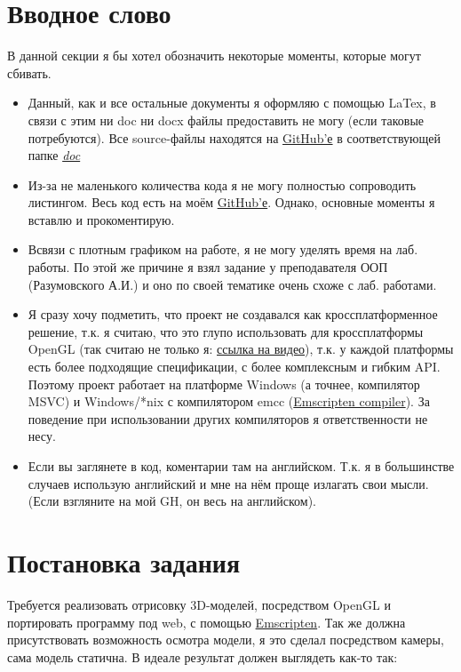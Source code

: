 \documentclass[12pt]{article}
\begin{document}
    \newpage

    \tableofcontents

    \newpage

    \section{Вводное слово}
    В данной секции я бы хотел обозначить некоторые моменты, которые могут
    сбивать.
    \begin{itemize}
        \item Данный, как и все остальные документы я оформляю с помощью 
        LaTex, в связи с этим ни doc ни docx файлы предоставить не могу 
        (если таковые потребуются). Все source-файлы находятся на 
        \href{https://github.com/JuiceFV/Emscripten_OpenGL}{GitHub'е}
        в соответствующей папке \emph{\href{https://github.com/JuiceFV/Emscripten_OpenGL/tree/master/doc}{doc}}
        \item Из-за не маленького количества кода я не могу полностью сопроводить листингом.
        Весь код есть на моём \href{https://github.com/JuiceFV/Emscripten_OpenGL}{GitHub'е}.
        Однако, основные моменты я вставлю и прокоментирую.
        \item Всвязи с плотным графиком на работе, я не могу уделять время на лаб. работы.
        По этой же причине я взял задание у преподавателя ООП (Разумовского А.И.)
        и оно по своей тематике очень схоже с лаб. работами.
        \item Я сразу хочу подметить, что проект не создавался как кроссплатформенное
        решение, т.к. я считаю, что это глупо использовать для кроссплатформы
        OpenGL (так считаю не только я: \href{https://www.youtube.com/watch?v=W3gAzLwfIP0}{ссылка на видео}), т.к. у каждой платформы есть более подходящие спецификации, с 
        более комплексным и гибким API. Поэтому проект работает на
        платформе Windows (а точнее, компилятор MSVC) и Windows/*nix 
        с компилятором emcc (\href{https://emscripten.org/}{Emscripten compiler}).
        За поведение при использовании других компиляторов я ответственности не 
        несу.
        \item Если вы заглянете в код, коментарии там на английском. Т.к.
        я в большинстве случаев использую английский и мне на нём проще 
        излагать свои мысли. (Если взгляните на мой GH, он весь на английском).
    \end{itemize}
    \newpage
    \section{Постановка задания}
    Требуется реализовать отрисовку 3D-моделей, посредством OpenGL и портировать программу
    под web, с помощью \href{https://emscripten.org/}{Emscripten}. Так же должна 
    присутствовать возможность осмотра модели, я это сделал посредством камеры, 
    сама модель статична. В идеале результат должен выглядеть как-то так:
\end{document}
